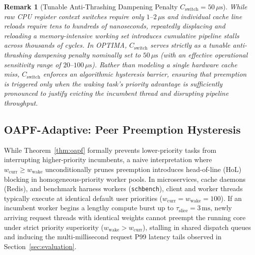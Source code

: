 \documentclass[conference]{IEEEtran}
\newtheorem{remark}{Remark}
\begin{document}
\begin{remark}[Tunable Anti-Thrashing Dampening Penalty $C_{\mathrm{switch}} = 50\,\mu\text{s}$]
While raw CPU register context switches require only $1\text{--}2\,\mu\text{s}$ and individual cache line reloads require tens to hundreds of nanoseconds, repeatedly displacing and reloading a memory-intensive working set introduces cumulative pipeline stalls across thousands of cycles. In OPTIMA, $C_{\mathrm{switch}}$ serves strictly as a \emph{tunable anti-thrashing dampening penalty} nominally set to $50\,\mu\text{s}$ (with an effective operational sensitivity range of $20\text{--}100\,\mu\text{s}$). Rather than modeling a single hardware cache miss, $C_{\mathrm{switch}}$ enforces an algorithmic hysteresis barrier, ensuring that preemption is triggered only when the waking task's priority advantage is sufficiently pronounced to justify evicting the incumbent thread and disrupting pipeline throughput.
\end{remark}

\subsection{OAPF-Adaptive: Peer Preemption Hysteresis}
\label{sec:oapf_adaptive}
While Theorem~\ref{thm:oapf} formally prevents lower-priority tasks from interrupting higher-priority incumbents, a naive interpretation where $w_{\mathrm{curr}} \ge w_{\mathrm{wake}}$ unconditionally prunes preemption introduces head-of-line (HoL) blocking in homogeneous-priority worker pools. In microservices, cache daemons (Redis), and benchmark harness workers (\texttt{schbench}), client and worker threads typically execute at identical default user priorities ($w_{\mathrm{curr}} = w_{\mathrm{wake}} = 100$). If an incumbent worker begins a lengthy compute burst up to $\tau_{\mathrm{slice}} = 3\,\mathrm{ms}$, newly arriving request threads with identical weights cannot preempt the running core under strict priority superiority ($w_{\mathrm{wake}} > w_{\mathrm{curr}}$), stalling in shared dispatch queues and inducing the multi-millisecond request P99 latency tails observed in Section~\ref{sec:evaluation}.
\end{document}
